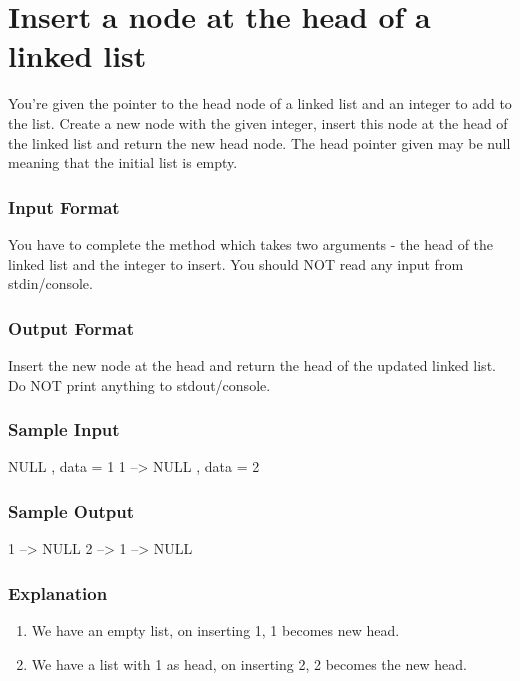 \section{Insert a node at the head of a linked list} %
\label{sec:Insert-a-node-at-the-head-of-a-linked-list}

You’re given the pointer to the head node of a linked list and an integer to add to the list. Create a new node with the given integer, insert this node at the head of the linked list and return the new head node. The head pointer given may be null meaning that the initial list is empty.


\subsubsection{Input Format}
You have to complete the  method which takes two arguments - the head of the linked list and the integer to insert. You should NOT read any input from stdin/console.


\subsubsection{Output Format}
Insert the new node at the head and return the head of the updated linked list. Do NOT print anything to stdout/console.


\subsubsection{Sample Input}
\begin{Code}
NULL , data = 1
1 –> NULL , data = 2
\end{Code}


\subsubsection{Sample Output}
\begin{Code}
1 --> NULL
2 --> 1 --> NULL
\end{Code}


\subsubsection{Explanation}
\begin{enumerate}
\item We have an empty list, on inserting 1, 1 becomes new head.
\item We have a list with 1 as head, on inserting 2, 2 becomes the new head.
\end{enumerate}


